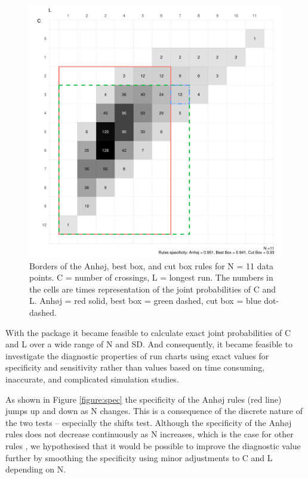 \begin{figure}[htbp]
  \centering
  \includegraphics[width=\textwidth]{fig_box11.pdf}
  \caption{Borders of the Anhøj, best box, and cut box rules for N = 11 data points. 
           C = number of crossings, L = longest run.
           The numbers in the cells are times representation of the joint
           probabilities of C and L.
           Anhøj = red solid, best box = green dashed, cut box = blue dot-dashed.}
  \label{figure:box11}
\end{figure}

With the  package it became feasible to calculate
exact joint probabilities of C and L over a wide range of N and SD. And
consequently, it became feasible to investigate the diagnostic
properties of run charts using exact values for specificity and
sensitivity rather than values based on time consuming, inaccurate, and
complicated simulation studies.

As shown in Figure \ref{figure:spec} the specificity of the Anhøj rules
(red line) jumps up and down as N changes. This is a consequence of the
discrete nature of the two tests -- especially the shifts test. Although
the specificity of the Anhøj rules does not decrease continuously as N
increases, which is the case for other rules \citep{anhoej2014}, we
hypothesised that it would be possible to improve the diagnostic value
further by smoothing the specificity using minor adjustments to C and L
depending on N.


